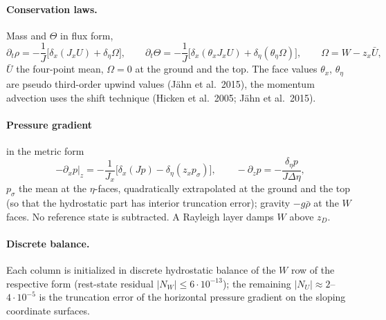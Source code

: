 \documentclass[11pt,a4paper]{article}
\begin{document}
\paragraph{Conservation laws.} Mass and $\Theta$ in flux form,
\[
\partial_t\rho=-\frac1J\Big[\delta_x(J_xU)+\delta_\eta\Omega\Big],\qquad
\partial_t\Theta=-\frac1J\Big[\delta_x(\theta_xJ_xU)+\delta_\eta(\theta_\eta\Omega)\Big],\qquad
\Omega=W-z_x\bar U,
\]
$\bar U$ the four-point mean, $\Omega=0$ at the ground and the top. The face values $\theta_x$,
$\theta_\eta$ are pseudo third-order upwind values (Jähn et al.\ 2015), the momentum advection uses the
shift technique (Hicken et al.\ 2005; Jähn et al.\ 2015).
\paragraph{Pressure gradient} in the metric form
\[
-\partial_xp|_z=-\frac1{J_x}\Big[\delta_x(Jp)-\delta_\eta(z_xp_\sigma)\Big],\qquad
-\partial_zp=-\frac{\delta_\eta p}{J\Delta\eta},
\]
$p_\sigma$ the mean at the $\eta$-faces, quadratically extrapolated at the ground and the top (so that
the hydrostatic part has interior truncation error); gravity $-g\bar\rho$ at the $W$ faces. No
reference state is subtracted. A Rayleigh layer damps $W$ above $z_D$.
\paragraph{Discrete balance.} Each column is initialized in discrete hydrostatic balance of the $W$
row of the respective form (rest-state residual $|N_W|\le6\cdot10^{-13}$); the remaining
$|N_U|\approx2$--$4\cdot10^{-5}$ is the truncation error of the horizontal pressure gradient on the
sloping coordinate surfaces.

\end{document}
